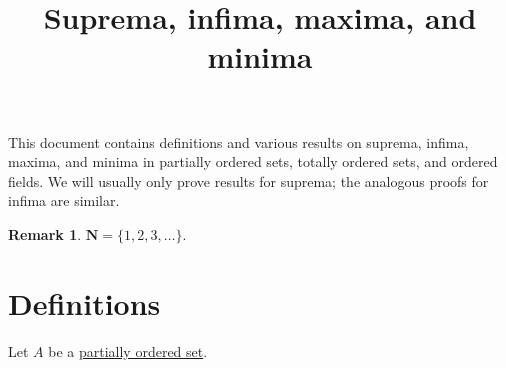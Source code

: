 \documentclass[12pt]{article}
\title{Suprema, infima, maxima, and minima}
\author{}
\date{\vspace{-24mm}}
\theoremstyle{definition}
\newtheorem*{remark}{Remark}
\newcommand{\N}{\mathbf{N}}
\begin{document}
\maketitle

\tableofcontents

\newpage

This document contains definitions and various results on suprema, infima, maxima, and minima in partially ordered sets, totally ordered sets, and ordered fields. We will usually only prove results for suprema; the analogous proofs for infima are similar.

\begin{remark}
    \( \N = \{ 1, 2, 3, \ldots \} \).
\end{remark}

\section{Definitions}
\label{sec:definitions}

Let \( A \) be a \href{https://en.wikipedia.org/wiki/Partially_ordered_set}{partially ordered set}.
\end{document}
